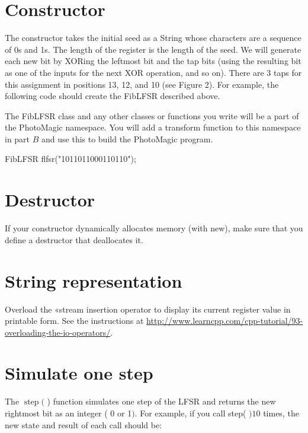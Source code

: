 \documentclass[10pt]{article}
\begin{document}
\section*{Constructor}
The constructor takes the initial seed as a String whose characters are a sequence of 0s and 1s. The length of the register is the length of the seed. We will generate each new bit by XORing the leftmost bit and the tap bits (using the resulting bit as one of the inputs for the next XOR operation, and so on). There are 3 taps for this assignment in positions 13, 12, and 10 (see Figure 2). For example, the following code should create the FibLFSR described above.

The FibLFSR class and any other classes or functions you write will be a part of the PhotoMagic namespace. You will add a transform function to this namespace in part $B$ and use this to build the PhotoMagic program.

FibLFSR flfsr("1011011000110110");

\section*{Destructor}
If your constructor dynamically allocates memory (with new), make sure that you define a destructor that deallocates it.

\section*{String representation}
Overload the «stream insertion operator to display its current register value in printable form. See the instructions at \href{http://www.learncpp.com/cpp-tutorial/93-overloading-the-io-operators/}{http://www.learncpp.com/cpp-tutorial/93-overloading-the-io-operators/}.

\section*{Simulate one step}
The $\operatorname{step}($ ) function simulates one step of the LFSR and returns the new rightmost bit as an integer ( 0 or 1$)$. For example, if you call step( $) 10$ times, the new state and result of each call should be:
\end{document}
